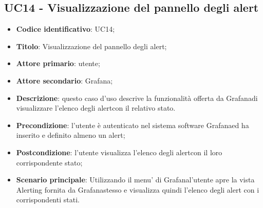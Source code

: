\subsection{UC14 - Visualizzazione del pannello degli alert}
\begin{itemize}
	\item \textbf{Codice identificativo}: UC14;
	\item \textbf{Titolo}: Visualizzazione del pannello degli alert;
	\item \textbf{Attore primario}: utente;
	\item \textbf{Attore secondario}: Grafana\glo;
	\item \textbf{Descrizione}: questo caso d'uso descrive la funzionalità offerta da Grafana\glosp di visualizzare l'elenco degli alert\glosp con il relativo stato.
	\item \textbf{Precondizione}: l'utente è autenticato nel sistema software Grafana\glosp ed ha inserito e definito almeno un alert\glo;
	\item \textbf{Postcondizione}: l'utente visualizza l'elenco degli alert\glosp con il loro corrispondente stato;
	\item \textbf{Scenario principale}: Utilizzando il menu' di Grafana\glosp l'utente apre la vista Alerting fornita da Grafana\glosp stesso e visualizza quindi l'elenco degli alert con i corrispondenti stati.
\end{itemize} 
